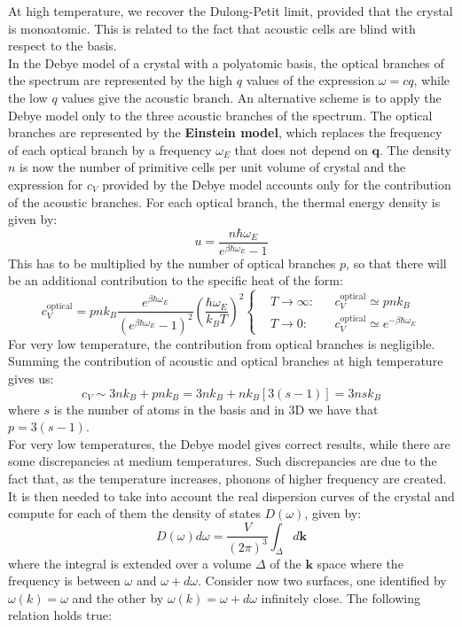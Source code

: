 \documentclass[10.75pt,a4paper,openright,bottom=2cm]{article}
\renewcommand{\Vec}[1]{\boldsymbol{#1}}
\begin{document}
At high temperature, we recover the Dulong-Petit limit, provided that the crystal is monoatomic. This is related to the fact that acoustic cells are blind with respect to the basis.\\
In the Debye model of a crystal with a polyatomic basis, the optical branches of the spectrum are represented by the high $q$ values of the expression $\omega=cq$, while the low $q$ values give the acoustic branch. An alternative scheme is to apply the Debye model only to the three acoustic branches of the spectrum. The optical branches are represented by the \textbf{Einstein model}, which replaces the frequency of each optical branch by a frequency $\omega_E$ that does not depend on $\Vec{q}$. The density $n$ is now the number of primitive cells per unit volume of crystal and the expression for $c_V$ provided by the Debye model accounts only for the contribution of the acoustic branches. For each optical branch, the thermal energy density is given by:
\[
u=\frac{n\hbar\omega_E}{e^{\beta\hbar\omega_E}-1}
\]
This has to be multiplied by the number of optical branches $p$, so that there will be an additional contribution to the specific heat of the form:
\[
c_V^{\text{optical}}=pnk_B\frac{e^{\beta\hbar\omega_E}}{(e^{\beta\hbar\omega_E}-1)^2}\left(\frac{\hbar\omega_E}{k_BT}\right)^2
\left\{
\begin{aligned}
&T\to\infty: &&c_V^{\text{optical}}\simeq pnk_B\\
&T\to0: &&c_V^{\text{optical}}\simeq e^{-\beta\hbar\omega_E}
\end{aligned}
\right.
\]
For very low temperature, the contribution from optical branches is negligible. Summing the contribution of acoustic and optical branches at high temperature gives us:
\[
c_V\sim3nk_B+pnk_B=3nk_B+nk_B[3(s-1)]=3nsk_B
\]
where $s$ is the number of atoms in the basis and in 3D we have that $p=3(s-1)$.\\
For very low temperatures, the Debye model gives correct results, while there are some discrepancies at medium temperatures. Such discrepancies are due to the fact that, as the temperature increases, phonons of higher frequency are created. It is then needed to take into account the real dispersion curves of the crystal and compute for each of them the density of states $D(\omega)$, given by:
\[
D(\omega)d\omega=\frac{V}{(2\pi)^3}\int_\Delta d\Vec{k}
\]
where the integral is extended over a volume $\Delta$ of the $\Vec{k}$ space where the frequency is between $\omega$ and $\omega+d\omega$. Consider now two surfaces, one identified by $\omega(k)=\omega$ and the other by $\omega(k)=\omega+d\omega$ infinitely close. The following relation holds true:
\end{document}
